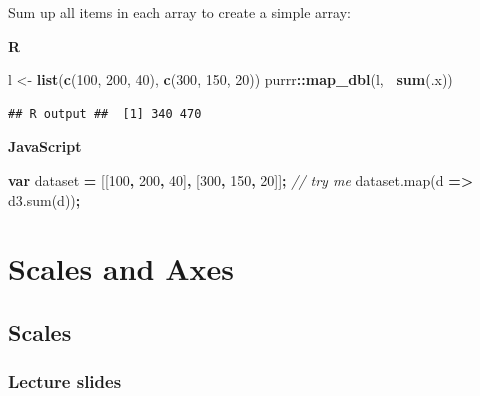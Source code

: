 \documentclass[openany]{book}
\newenvironment{Shaded}{\begin{snugshade}}{\end{snugshade}}
\newcommand{\AttributeTok}[1]{\textcolor[rgb]{0.77,0.63,0.00}{#1}}
\newcommand{\CommentTok}[1]{\textcolor[rgb]{0.56,0.35,0.01}{\textit{#1}}}
\newcommand{\DecValTok}[1]{\textcolor[rgb]{0.00,0.00,0.81}{#1}}
\newcommand{\KeywordTok}[1]{\textcolor[rgb]{0.13,0.29,0.53}{\textbf{#1}}}
\newcommand{\NormalTok}[1]{#1}
\newcommand{\OperatorTok}[1]{\textcolor[rgb]{0.81,0.36,0.00}{\textbf{#1}}}
\newcommand{\StringTok}[1]{\textcolor[rgb]{0.31,0.60,0.02}{#1}}
\newcommand{\VariableTok}[1]{\textcolor[rgb]{0.00,0.00,0.00}{#1}}
\begin{document}
Sum up all items in each array to create a simple array:

\textbf{R}

\begin{Shaded}
\begin{Highlighting}[]
\NormalTok{l <-}\StringTok{ }\KeywordTok{list}\NormalTok{(}\KeywordTok{c}\NormalTok{(}\DecValTok{100}\NormalTok{, }\DecValTok{200}\NormalTok{, }\DecValTok{40}\NormalTok{), }\KeywordTok{c}\NormalTok{(}\DecValTok{300}\NormalTok{, }\DecValTok{150}\NormalTok{, }\DecValTok{20}\NormalTok{))}
\NormalTok{purrr}\OperatorTok{::}\KeywordTok{map_dbl}\NormalTok{(l, }\OperatorTok{~}\KeywordTok{sum}\NormalTok{(.x))}
\end{Highlighting}
\end{Shaded}

\begin{verbatim}
## R output ##  [1] 340 470
\end{verbatim}

\textbf{JavaScript}

\begin{Shaded}
\begin{Highlighting}[]
\KeywordTok{var}\NormalTok{ dataset }\OperatorTok{=}\NormalTok{ [[}\DecValTok{100}\OperatorTok{,} \DecValTok{200}\OperatorTok{,} \DecValTok{40}\NormalTok{]}\OperatorTok{,}\NormalTok{ [}\DecValTok{300}\OperatorTok{,} \DecValTok{150}\OperatorTok{,} \DecValTok{20}\NormalTok{]]}\OperatorTok{;}     \CommentTok{// try me}
\VariableTok{dataset}\NormalTok{.}\AttributeTok{map}\NormalTok{(d }\OperatorTok{=>} \VariableTok{d3}\NormalTok{.}\AttributeTok{sum}\NormalTok{(d))}\OperatorTok{;}
\end{Highlighting}
\end{Shaded}

\hypertarget{scales-and-axes}{%
\chapter{Scales and Axes }\label{scales-and-axes}}

\hypertarget{scales}{%
\section{Scales}\label{scales}}

\hypertarget{lecture-slides-1}{%
\subsection{Lecture slides }\label{lecture-slides-1}}
\end{document}
